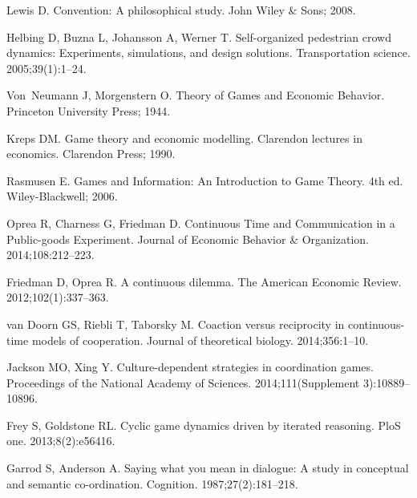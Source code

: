 \documentclass[10pt,letterpaper]{article}
\begin{document}
\begin{thebibliography}{10}

Lewis D.
\newblock Convention: A philosophical study.
\newblock John Wiley \& Sons; 2008.

Helbing D, Buzna L, Johansson A, Werner T.
\newblock Self-organized pedestrian crowd dynamics: Experiments, simulations,
  and design solutions.
\newblock Transportation science. 2005;39(1):1--24.

Von~Neumann J, Morgenstern O.
\newblock Theory of Games and Economic Behavior.
\newblock Princeton University Press; 1944.

Kreps DM.
\newblock Game theory and economic modelling.
\newblock Clarendon lectures in economics. Clarendon Press; 1990.

Rasmusen E.
\newblock Games and Information: An Introduction to Game Theory.
\newblock 4th ed. Wiley-Blackwell; 2006.

Oprea R, Charness G, Friedman D.
\newblock Continuous Time and Communication in a Public-goods Experiment.
\newblock Journal of Economic Behavior \& Organization. 2014;108:212--223.

Friedman D, Oprea R.
\newblock A continuous dilemma.
\newblock The American Economic Review. 2012;102(1):337--363.

van Doorn GS, Riebli T, Taborsky M.
\newblock Coaction versus reciprocity in continuous-time models of cooperation.
\newblock Journal of theoretical biology. 2014;356:1--10.

Jackson MO, Xing Y.
\newblock Culture-dependent strategies in coordination games.
\newblock Proceedings of the National Academy of Sciences. 2014;111(Supplement
  3):10889--10896.

Frey S, Goldstone RL.
\newblock Cyclic game dynamics driven by iterated reasoning.
\newblock PloS one. 2013;8(2):e56416.

Garrod S, Anderson A.
\newblock Saying what you mean in dialogue: A study in conceptual and semantic
  co-ordination.
\newblock Cognition. 1987;27(2):181--218.


\end{thebibliography}
\end{document}
